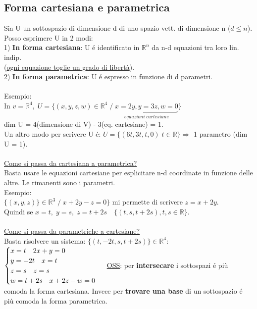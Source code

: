 \documentclass[12pt]{article}
\begin{document}
\subsection{Forma cartesiana e parametrica}
Sia U un sottospazio di dimensione d di uno spazio vett. di dimensione n ($d \leq n$).\\
Posso esprimere U in 2 modi:\\
1) \textbf{In forma cartesiana}: U é identificato in $\mathbb{R}^n$ da n-d equazioni tra loro lin. indip.\\ (\underline{ogni equazione toglie un grado di libertà}).\\
2) \textbf{In forma parametrica}: U é espresso in funzione di d parametri.\\\\
Esempio:\\
In $v=\mathbb{R}^4,\; U = \{(x,y,z,w) \in \mathbb{R}^4 \;/\; \underbrace{x=2y, y=3z, w=0}_{equazioni\; cartesiane}\}$\\ dim U = 4(dimensione di V) - 3(eq. cartesiane) = 1.\\
Un altro modo per scrivere U é: $U=\{(6t,3t,t,0)\;t\in \mathbb R\} \Rightarrow$ 1 parametro (dim U = 1).\\\\
\underline{Come si passa da cartesiana a parametrica?}\\
Basta usare le equazioni cartesiane per esplicitare n-d coordinate in funzione delle altre. Le rimanenti sono i parametri.\\
Esempio:\\
$\{(x,y,z)\} \in \mathbb{R}^3\;/\; x+2y-z=0\}$ mi permette di scrivere $z=x+2y$.\\
Quindi se $x=t,\;y=s,\;z=t+2s\quad \{(t,s,t+2s),t,s\in \mathbb{R}\}$.\\\\
\underline{Come si passa da parametriche a cartesiane?}\\
Basta risolvere un sistema: $\{(t,-2t,s,t+2s)\} \in \mathbb{R}^4$:\\
$
\begin{cases}
 x=t\quad 2x+y=0\\
 y=-2t\quad x=t\\
 z=s\quad z=s\\
w=t+2s\quad x+2z-w=0
\end{cases}\\\\\\
$
\underline{OSS}: per \textbf{intersecare} i sottospazi é più comoda la forma cartesiana. Invece per \textbf{trovare una base} di un sottospazio é più comoda la forma parametrica.\\\\
\end{document}
